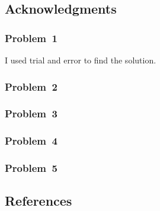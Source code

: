 
\newpage\clearpage
\subsection*{Acknowledgments}

\subsubsection*{Problem~1}
I used trial and error to find the solution.

\subsubsection*{Problem~2}

\subsubsection*{Problem~3}

\subsubsection*{Problem~4}

\subsubsection*{Problem~5}

\subsection*{References}
\printbibliography
